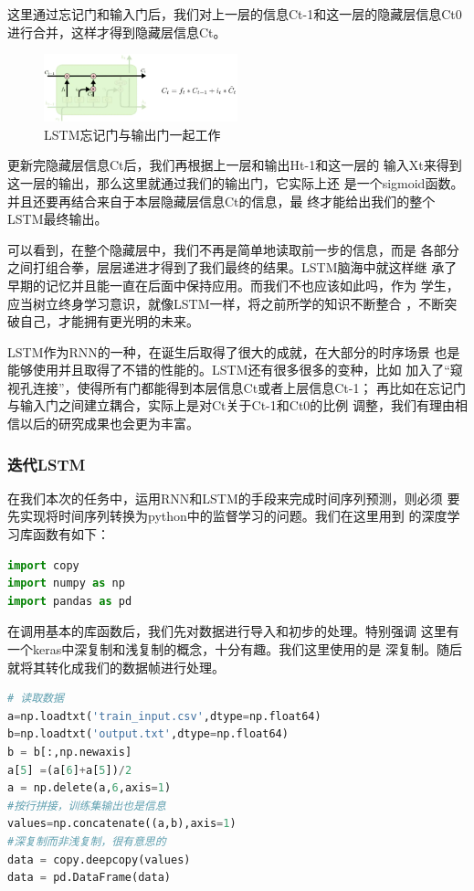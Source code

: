 \documentclass[11pt,a4paper]{elegantpaper}
\begin{document}
\begin{multicols}{2}
这里通过忘记门和输入门后，我们对上一层的信息Ct-1和这一层的隐藏层信息Ct0进行合并，这样才得到隐藏层信息Ct。

\begin{figure}[H]
  \centering
  \includegraphics[width=0.5\textwidth]{images/TO.png}
  \caption{LSTM忘记门与输出门一起工作} 
\end{figure}

更新完隐藏层信息Ct后，我们再根据上一层和输出Ht-1和这一层的
输入Xt来得到这一层的输出，那么这里就通过我们的输出门，它实际上还
是一个sigmoid函数。并且还要再结合来自于本层隐藏层信息Ct的信息，最
终才能给出我们的整个LSTM最终输出。

可以看到，在整个隐藏层中，我们不再是简单地读取前一步的信息，而是
各部分之间打组合拳，层层递进才得到了我们最终的结果。LSTM脑海中就这样继
承了早期的记忆并且能一直在后面中保持应用。而我们不也应该如此吗，作为
学生，应当树立终身学习意识，就像LSTM一样，将之前所学的知识不断整合
，不断突破自己，才能拥有更光明的未来。

LSTM作为RNN的一种，在诞生后取得了很大的成就，在大部分的时序场景
也是能够使用并且取得了不错的性能的。LSTM还有很多很多的变种，比如
加入了“窥视孔连接”，使得所有门都能得到本层信息Ct或者上层信息Ct-1；
再比如在忘记门与输入门之间建立耦合，实际上是对Ct关于Ct-1和Ct0的比例
调整，我们有理由相信以后的研究成果也会更为丰富。

\subsubsection{迭代LSTM}

在我们本次的任务中，运用RNN和LSTM的手段来完成时间序列预测，则必须
要先实现将时间序列转换为python中的监督学习的问题。我们在这里用到
的深度学习库函数有如下：

\begin{lstlisting}[language=Python]
import copy
import numpy as np
import pandas as pd
\end{lstlisting}

在调用基本的库函数后，我们先对数据进行导入和初步的处理。特别强调
这里有一个keras中深复制和浅复制的概念，十分有趣。我们这里使用的是
深复制。随后就将其转化成我们的数据帧进行处理。

\begin{lstlisting}[language=Python]
# 读取数据
a=np.loadtxt('train_input.csv',dtype=np.float64)
b=np.loadtxt('output.txt',dtype=np.float64)
b = b[:,np.newaxis]
a[5] =(a[6]+a[5])/2
a = np.delete(a,6,axis=1)
#按行拼接，训练集输出也是信息
values=np.concatenate((a,b),axis=1)
#深复制而非浅复制，很有意思的
data = copy.deepcopy(values)
data = pd.DataFrame(data)
\end{lstlisting}


\end{multicols}
\end{document}
